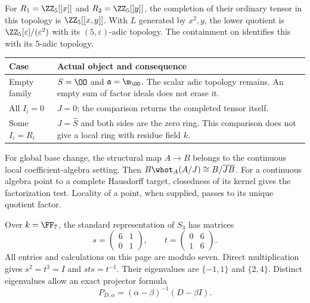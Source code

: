 For $R_1=\ZZ_5[[x]]$ and $R_2=\ZZ_5[[y]]$, the completion of their ordinary tensor in this topology is $\ZZ_5[[x,y]]$. With $L$ generated by $x^2,y$, the lower quotient is $\ZZ_5[\varepsilon]/(\varepsilon^2)$ with its $(5,\varepsilon)$-adic topology. The containment on  identifies this with its $5$-adic topology.

\begin{center}\small
\begin{tabularx}{\linewidth}{@{}p{.22\linewidth}Y@{}}\toprule
Case & Actual object and consequence\\\midrule
Empty family & $S=\OO$ and $\mathfrak a=\m_\OO$. The scalar adic topology remains. An empty sum of factor ideals does not erase it.\\
All $I_i=0$ & $J=0$; the comparison returns the completed tensor itself.\\
Some $I_i=R_i$ & $J=\widehat S$ and both sides are the zero ring. This comparison does not give a local ring with residue field $k$.\\\bottomrule
\end{tabularx}
\end{center}

For global base change, the structural map $A\to B$ belongs to the continuous local coefficient-algebra setting. Then $B\whot_A(A/J)\cong B/\overline{JB}$. For a continuous algebra point to a complete Hausdorff target, closedness of its kernel gives the factorization test. Locality of a point, when supplied, passes to its unique quotient factor.


Over $k=\FF_7$, the standard representation of $S_3$ has matrices
\[
 s=\begin{pmatrix}6&1\\0&1\end{pmatrix},\qquad
 t=\begin{pmatrix}0&6\\1&6\end{pmatrix}.
\]
All entries and calculations on this page are modulo seven. Direct multiplication gives $s^2=t^3=I$ and $sts=t^{-1}$. Their eigenvalues are $\{-1,1\}$ and $\{2,4\}$. Distinct eigenvalues allow an exact projector formula
\[
P_{D,\alpha}=(\alpha-\beta)^{-1}(D-\beta I).
\]

